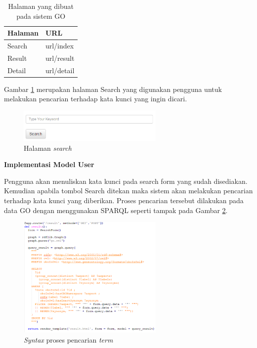 \begin{table}[h!]
	\footnotesize
	\caption{Halaman yang dibuat pada sistem GO}
	\centering
	\begin{tabulary}{0.47\textwidth}{LL}
		\toprule
		\parbox{8em}{Halaman} & URL \\
		\midrule
		Search & url/index\\
		Result & url/result\\
		Detail & url/detail\\
		\bottomrule
	\end{tabulary}
	\label{tab:info}
\end{table}

Gambar \ref{fig:search} merupakan halaman Search yang digunakan pengguna untuk melakukan pencarian terhadap kata kunci yang ingin dicari.

\begin{figure}[h!] %
	\centering
	\includegraphics[width=200pt]{search.png}
	\caption{Halaman \textit{search}}
	\label{fig:search}
\end{figure}

\begin{flushleft}
	\textbf{Implementasi Model User}
\end{flushleft}

Pengguna akan menuliskan kata kunci pada search form yang sudah disediakan. Kemudian apabila tombol Search ditekan maka sistem akan melakukan pencarian terhadap kata kunci yang diberikan. Proses pencarian tersebut dilakukan pada data GO dengan menggunakan SPARQL seperti tampak pada Gambar \ref{fig:sparql}.

\begin{figure}[h!] %
	\centering
	\includegraphics[width=200pt]{sparql.png}
	\caption{\textit{Syntax} proses pencarian \textit{term}}
	\label{fig:sparql}
\end{figure}

